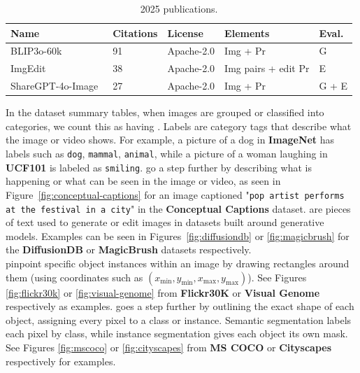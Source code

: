 ﻿\documentclass[11pt,a4paper]{article}
\begin{document}
\begin{table}[H]
\centering
\caption{2025 publications.}
\begin{tabular}{p{2.5cm}p{1.65cm}p{3.05cm}p{3.2cm}p{2.15cm}}
\hline
\textbf{Name} & \textbf{Citations} & \textbf{License} & \textbf{Elements} & \textbf{Eval.}\\
\hline
BLIP3o-60k~\cite{chen2025blip3o} & 91 & Apache-2.0 & Img + Pr & G\\
\hline
ImgEdit~\cite{ye2025imgedit} & 38 & Apache-2.0 & Img pairs + edit Pr & E\\
\hline
ShareGPT-4o-Image~\cite{chen2025sharegpt} & 27 & Apache-2.0 & Img + Pr & G + E\\
\hline
\end{tabular}
\end{table}


In the dataset summary tables, when images are grouped or classified into categories, we count this as having . Labels are category tags that describe what the image or video shows. For example, a picture of a dog in \textbf{ImageNet} has labels such as \texttt{dog}, \texttt{mammal}, \texttt{animal}, while a picture of a woman laughing in \textbf{UCF101} is labeled as \texttt{smiling}.   go a step further by describing what is happening or what can be seen in the image or video, as seen in Figure~\ref{fig:conceptual-captions} for an image captioned "\texttt{pop artist performs at the festival in a city}" in the \textbf{Conceptual Captions} dataset. are pieces of text used to generate or edit images in datasets built around generative models. Examples can be seen in Figures~\ref{fig:diffusiondb} or \ref{fig:magicbrush} for the \textbf{DiffusionDB} or \textbf{MagicBrush} datasets respectively.\\

 pinpoint specific object instances within an image by drawing rectangles around them (using coordinates such as $(x_{\min},y_{\min},x_{\max},y_{\max})$). See Figures \ref{fig:flickr30k} or \ref{fig:visual-genome} from \textbf{Flickr30K} or \textbf{Visual Genome} respectively as examples.  goes a step further by outlining the exact shape of each object, assigning every pixel to a class or instance. Semantic segmentation labels each pixel by class, while instance segmentation gives each object its own mask. See Figures \ref{fig:mscoco} or \ref{fig:cityscapes} from \textbf{MS COCO} or \textbf{Cityscapes} respectively for examples.\\
\end{document}
